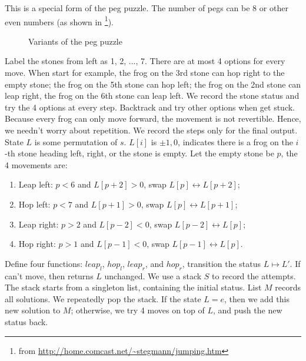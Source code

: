 \documentclass[b5paper]{article}
\begin{document}
This is a special form of the peg puzzle. The number of pegs can be 8 or other even numbers (as shown in \footnote{from \url{http://home.comcast.net/~stegmann/jumping.htm}}).

\begin{figure}[htbp]
 \centering
  \hspace{0.02\textwidth}
  \hspace{0.02\textwidth}
 \caption{Variants of the peg puzzle}
 \label{fig:pegpuzzles}
\end{figure}

Label the stones from left as 1, 2, ..., 7. There are at most 4 options for every move. When start for example, the frog on the 3rd stone can hop right to the empty stone; the frog on the 5th stone can hop left; the frog on the 2nd stone can leap right, the frog on the 6th stone can leap left. We record the stone status and try the 4 options at every step. Backtrack and try other options when get stuck. Because every frog can only move forward, the movement is not revertible. Hence, we needn't worry about repetition. We record the steps only for the final output. State $L$ is some permutation of $s$. $L[i]$ is $\pm 1, 0$, indicates there is a frog on the $i$-th stone heading left, right, or the stone is empty. Let the empty stone be $p$, the 4 movements are:

\begin{enumerate}
\item Leap left: $p < 6$ and $L[p+2] > 0$, swap $L[p] \leftrightarrow L[p+2]$;
\item Hop left: $p < 7$ and $L[p+1] > 0$, swap $L[p] \leftrightarrow L[p+1]$;
\item Leap right: $p > 2$ and $L[p-2] < 0$, swap $L[p-2] \leftrightarrow L[p]$;
\item Hop right: $p > 1$ and $L[p-1] < 0$, swap $L[p-1] \leftrightarrow L[p]$.
\end{enumerate}

Define four functions: $leap_l$, $hop_l$, $leap_r$, and $hop_r$, transition the status $L \mapsto L'$. If can't move, then returns $L$ unchanged. We use a stack $S$ to record the attempts. The stack starts from a singleton list, containing the initial status. List $M$ records all solutions. We repeatedly pop the stack. If the state $L = e$, then we add this new solution to $M$; otherwise, we try 4 moves on top of $L$, and push the new status back.
\end{document}
